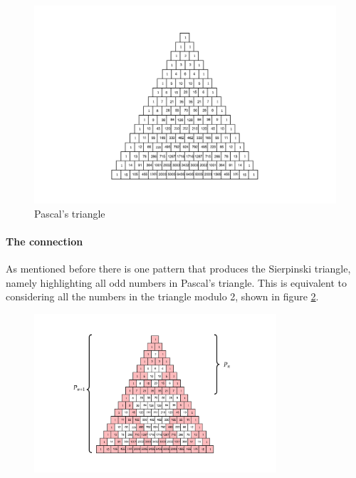 \documentclass[a4paper,11pt,twoside]{article}
\begin{document}
\begin{figure}[htbp]
\centering
\includegraphics[width=.9\linewidth]{media/tikz/pascals-triangle.png}
\caption{\label{fig:pascal-triangle}Pascal's triangle}
\end{figure}
\paragraph{The connection}
\label{sec:orgce2750f}
As mentioned before there is one pattern that produces the Sierpinski triangle, namely highlighting all odd numbers in Pascal's triangle. This is equivalent to considering all the numbers in the triangle modulo 2, shown in figure \ref{fig:pascal-sierpinski-tri}.

\begin{figure}[htbp]
\centering
\includegraphics[width=9cm]{media/tikz/pascal-sierpinski-tri.png}
\label{fig:pascal-sierpinski-tri}
\end{figure}
\end{document}
